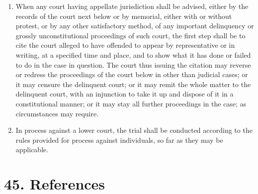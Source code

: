 \documentclass[
]{book}
\begin{document}
\begin{enumerate}
\item
  When any court having appellate jurisdiction shall be advised, either by the records of the court next below or by memorial, either with or without protest, or by any other satisfactory method, of any important delinquency or grossly unconstitutional proceedings of such court, the first step shall be to cite the court alleged to have offended to appear by representative or in writing, at a specified time and place, and to show what it has done or failed to do in the case in question. The court thus issuing the citation may reverse or redress the proceedings of the court below in other than judicial cases; or it may censure the delinquent court; or it may remit the whole matter to the delinquent court, with an injunction to take it up and dispose of it in a constitutional manner; or it may stay all further proceedings in the case; as circumstances may require.
\item
  In process against a lower court, the trial shall be conducted according to the rules provided for process against individuals, so far as they may be applicable.
\end{enumerate}

\hypertarget{references}{%
\section*{45. References}\label{references}}

\protect\hypertarget{chapter-slug-45-references}{\href{}{}}
\end{document}
